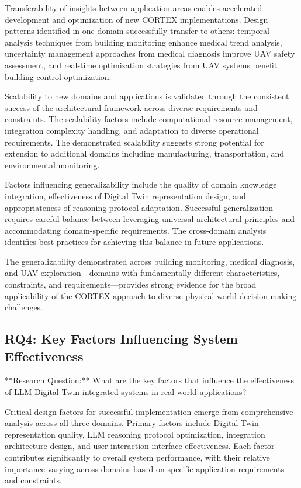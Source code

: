 Transferability of insights between application areas enables accelerated development and optimization of new CORTEX implementations. Design patterns identified in one domain successfully transfer to others: temporal analysis techniques from building monitoring enhance medical trend analysis, uncertainty management approaches from medical diagnosis improve UAV safety assessment, and real-time optimization strategies from UAV systems benefit building control optimization.

Scalability to new domains and applications is validated through the consistent success of the architectural framework across diverse requirements and constraints. The scalability factors include computational resource management, integration complexity handling, and adaptation to diverse operational requirements. The demonstrated scalability suggests strong potential for extension to additional domains including manufacturing, transportation, and environmental monitoring.

Factors influencing generalizability include the quality of domain knowledge integration, effectiveness of Digital Twin representation design, and appropriateness of reasoning protocol adaptation. Successful generalization requires careful balance between leveraging universal architectural principles and accommodating domain-specific requirements. The cross-domain analysis identifies best practices for achieving this balance in future applications.

The generalizability demonstrated across building monitoring, medical diagnosis, and UAV exploration—domains with fundamentally different characteristics, constraints, and requirements—provides strong evidence for the broad applicability of the CORTEX approach to diverse physical world decision-making challenges.

\subsection{RQ4: Key Factors Influencing System Effectiveness}

**Research Question:** What are the key factors that influence the effectiveness of LLM-Digital Twin integrated systems in real-world applications?

Critical design factors for successful implementation emerge from comprehensive analysis across all three domains. Primary factors include Digital Twin representation quality, LLM reasoning protocol optimization, integration architecture design, and user interaction interface effectiveness. Each factor contributes significantly to overall system performance, with their relative importance varying across domains based on specific application requirements and constraints.

